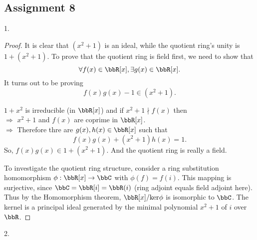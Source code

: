 \subsection{Assignment 8}

\begin{exercise}
    1.
\end{exercise}

\begin{proof}

    It is clear that $(x^2+1)$ is an ideal, while the quotient ring's unity is $1+(x^2+1)$. To prove that the quotient ring is field first, we need to show that $$\forall f(x)\in \bbR[x], \exists g(x)\in \bbR[x].$$
    It turns out to be proving 
    $$f(x)g(x)-1\in (x^2+1). $$


    $1+x^2$ is irreducible (in $\bbR[x]$) and if $x^2+1\nmid f(x)$ then\\
    $\Rightarrow$ $x^2+1$ and $f(x)$ are coprime in $\bbR[x]$. \\
    $\Rightarrow$ Therefore thre are $g(x),h(x)\in \bbR[x]$ such that $$f(x)g(x)+(x^2+1)h(x)=1.$$ So, $f(x)g(x)\in 1+(x^2+1)$. And the quotient ring is really a field.

    To investigate the quotient ring structure, consider a ring substitution homomorphism $\phi:\bbR[x]\rightarrow\bbC$ with $\phi(f)=f(i)$. This mapping is surjective, since $\bbC=\bbR[i]=\bbR(i)$ (ring adjoint equals field adjoint here). Thus by the Homomorphism theorem, $\bbR[x]/\mathrm{ker} \phi$ is isomorphic to $\bbC$. The kernel is a principal ideal generated by the minimal polynomial $x^2+1$ of $i$ over $\bbR$. 
\end{proof}

\begin{exercise}
    2.
\end{exercise}

